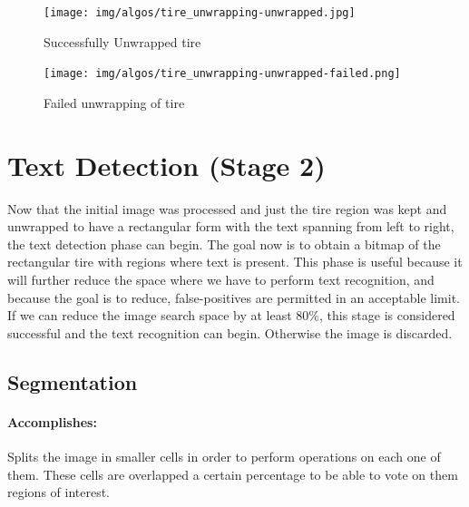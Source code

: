 \begin{figure}
    \centering
    \texttt{[image: img/algos/tire\_unwrapping-unwrapped.jpg]}
    \caption{Successfully Unwrapped tire}
    \label{fig:tire_unwrapping-unwrapped}
\end{figure}
\begin{figure}
    \centering
    \texttt{[image: img/algos/tire\_unwrapping-unwrapped-failed.png]}
    \caption{Failed unwrapping of tire}
    \label{fig:tire_unwrapping-unwrapped-failed}
\end{figure}

\section{Text Detection (Stage 2)}\label{sec:text-detection}
Now that the initial image was processed and just the tire region was kept and unwrapped to have a rectangular form with the text spanning from left to right, the text detection phase can begin. The goal now is to obtain a bitmap of the rectangular tire with regions where text is present. This phase is useful because it will further reduce the space where we have to perform text recognition, and because the goal is to reduce, false-positives are permitted in an acceptable limit. If we can reduce the image search space by at least 80\%, this stage is considered successful and the text recognition can begin. Otherwise the image is discarded.

\subsection{Segmentation}
\label{subsec:segmentation}

\paragraph*{Accomplishes:}\mbox{}\par
Splits the image in smaller cells in order to perform operations on each one of them. These cells are overlapped a certain percentage to be able to vote on them regions of interest.

